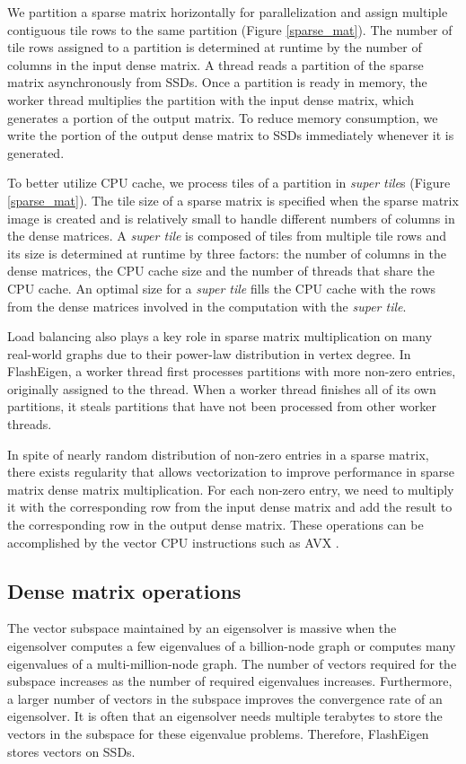 We partition a sparse matrix horizontally for parallelization and assign multiple
contiguous tile rows to the same partition (Figure \ref{sparse_mat}).
The number of tile rows assigned to a partition is determined at runtime by
the number of columns in the input dense matrix.
A thread reads a partition of the sparse matrix
asynchronously from SSDs. Once a partition is ready in memory, the worker
thread multiplies the partition with the input dense matrix, which generates
a portion of the output matrix. To reduce memory consumption,
we write the portion of the output dense matrix to SSDs immediately whenever
it is generated.

To better utilize CPU cache, we process tiles of a partition in
\textit{super tile}s (Figure \ref{sparse_mat}). The tile size of a sparse
matrix is specified when the sparse matrix image is created and is relatively
small to handle different numbers of columns in the dense matrices.
A \textit{super tile} is composed of tiles from multiple tile rows and its
size is determined at runtime by three factors: the number of columns
in the dense matrices, the CPU cache size and the number of threads that
share the CPU cache. An optimal size for a \textit{super tile} fills
the CPU cache with the rows from the dense matrices involved in
the computation with the \textit{super tile}.

Load balancing also plays a key role in sparse matrix multiplication on
many real-world graphs due to their power-law distribution in vertex degree.
In FlashEigen, a worker thread first processes partitions with more non-zero
entries, originally assigned to the thread. When a worker thread finishes
all of its own partitions, it steals partitions that have not been processed
from other worker threads.

In spite of nearly random distribution of non-zero entries in a sparse matrix,
there exists regularity that allows vectorization to improve performance
in sparse matrix dense matrix multiplication. For each non-zero entry, we
need to multiply it with the corresponding row from the input dense matrix
and add the result to the corresponding row in the output dense matrix.
These operations can be accomplished by the vector CPU instructions such as
AVX \cite{avx}.

\subsection{Dense matrix operations}
The vector subspace maintained by an eigensolver is massive when the eigensolver
computes a few eigenvalues of a billion-node graph or computes many eigenvalues
of a multi-million-node graph. The number of vectors required for the subspace
increases as the number of required eigenvalues increases. Furthermore, a larger
number of vectors in the subspace improves the convergence rate of an eigensolver. 
It is often that an eigensolver needs multiple terabytes to store the vectors
in the subspace for these eigenvalue problems. Therefore, FlashEigen stores
vectors on SSDs.

